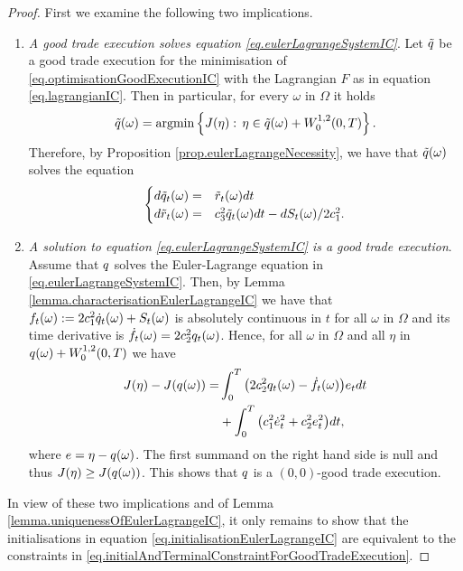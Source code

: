 \documentclass[10pt,a4paper]{article}
\begin{document}
\begin{proof}
First we examine the following two implications.
\begin{enumerate}
	\item \emph{A good trade execution solves equation \eqref{eq.eulerLagrangeSystemIC}}. Let $\tilde{q}$ be a good trade execution for the minimisation of \eqref{eq.optimisationGoodExecutionIC} with the Lagrangian $F$ as in equation \eqref{eq.lagrangianIC}. Then in particular, for every $\omega$ in $\Omega$ it holds
	\begin{equation*}
	\tilde{q}(\omega) = \mathrm{argmin} \left\lbrace J(\eta):\, \eta \in \tilde{q}(\omega) + W^{1,2}_{0}(0,T) \right\rbrace.
	\end{equation*}
	Therefore, by Proposition \ref{prop.eulerLagrangeNecessity}, we have that $\tilde{q}(\omega)$ solves the equation
	\begin{equation*}
	\begin{cases}
	d\tilde{q}_t(\omega)=&   \tilde{r}_t(\omega)dt \\
	d\tilde{r}_t(\omega)=& c_{3}^{2} \tilde{q}_t(\omega)dt - dS_t(\omega)/2c_{1}^{2}.
	\end{cases}
	\end{equation*}
	\item \emph{A solution to equation \eqref{eq.eulerLagrangeSystemIC} is a good trade execution}. Assume that $q$ solves the Euler-Lagrange equation in \eqref{eq.eulerLagrangeSystemIC}. Then, by Lemma \ref{lemma.characterisationEulerLagrangeIC} we have that $f_t(\omega):= 2c_{1}^{2} \dot{q}_t(\omega) + S_t(\omega)$ is absolutely continuous in $t$ for all $\omega$ in $\Omega$ and its time derivative  is $\dot{f}_t(\omega) = 2 c_{2}^{2} q_t(\omega)$. Hence, for  all $\omega$ in $\Omega$ and all $\eta$ in $q(\omega) + W^{1,2}_{0}(0,T)$ we have 
	\begin{equation*}
	\begin{split}
	J(\eta) - J(q(\omega)) = &
	\int_{0}^{T} \big(2c_{2}^{2} q_t(\omega) - \dot{f}_t (\omega) \big)e_t dt\\
	& + \int_{0}^{T} \big(c_{1}^{2} \dot{e}_t^{2} + c_{2}^{2} e_t^{2} \big) dt,
	\end{split}
	\end{equation*}
	where $e = \eta-q(\omega)$.  The first summand on the right hand side is null and thus $J(\eta)\geq J(q(\omega))$. This shows that $q$ is a $(0,0)$-good trade execution. 
\end{enumerate}
In view of these two implications and of Lemma \ref{lemma.uniquenessOfEulerLagrangeIC}, it only remains to show that the initialisations in equation \eqref{eq.initialisationEulerLagrangeIC} are equivalent to the constraints in \eqref{eq.initialAndTerminalConstraintForGoodTradeExecution}.


\end{proof}
\end{document}

